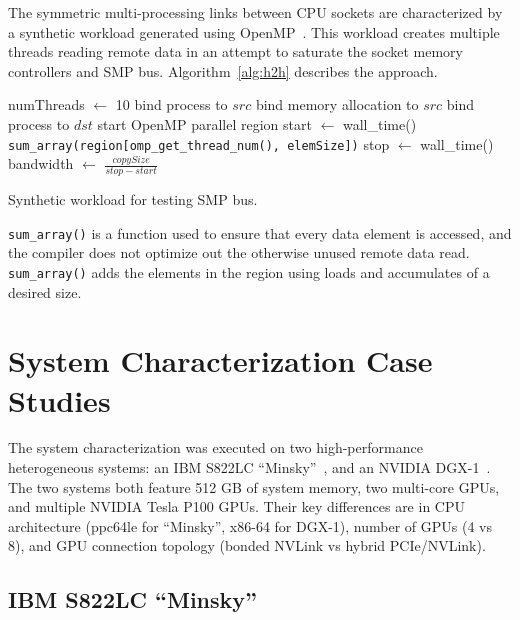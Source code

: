 The symmetric multi-processing links between CPU sockets are characterized by a synthetic workload generated using OpenMP~\cite{openmp2013}.
This workload creates multiple threads reading remote data in an attempt to saturate the socket memory controllers and SMP bus.
Algorithm~\ref{alg:h2h} describes the approach.

\begin{algorithm}[ht]
    \SetAlgoLined
    numThreads $\gets$ 10\;
    \;
     {
        bind process to $src$\;
        bind memory allocation to $src$\;
        bind process to $dst$\;
        start OpenMP parallel region\;
        start $\gets$ wall\_time()\;
        \texttt{sum\_array(region[omp\_get\_thread\_num(), elemSize])}\;
        stop $\gets$ wall\_time()\;
        bandwidth $\gets$ $\frac{copySize}{stop - start}$\;
    }
    \caption{Synthetic workload for testing SMP bus.}
    \label{alg:h2h}
\end{algorithm}

\texttt{sum\_array()} is a function used to ensure that every data element is accessed, and the compiler does not optimize out the otherwise unused remote data read.
\texttt{sum\_array()} adds the elements in the region using loads and accumulates of a desired size.

%
%
\section{System Characterization Case Studies}

The system characterization was executed on two high-performance heterogeneous systems: an IBM S822LC ``Minsky''~\cite{ibm2015minsky}, and an NVIDIA DGX-1~\cite{nvidia2016dgx1}.
The two systems both feature 512 GB of system memory, two multi-core GPUs, and multiple NVIDIA Tesla P100 GPUs.
Their key differences are in CPU architecture (ppc64le for ``Minsky'', x86-64 for DGX-1), number of GPUs (4 vs 8), and GPU connection topology (bonded NVLink vs hybrid PCIe/NVLink).

\subsection{IBM S822LC ``Minsky''}
\label{sec:topology-minsky}


